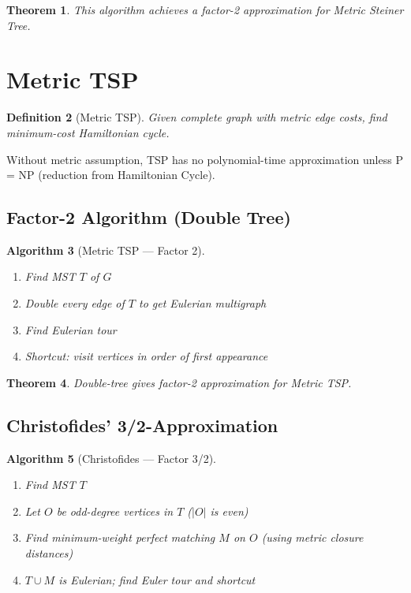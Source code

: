 \documentclass[11pt,oneside]{book}
\newtheorem{theorem}{Theorem}[chapter]
\newtheorem{definition}[theorem]{Definition}
\newtheorem{algorithmdef}[theorem]{Algorithm}
\begin{document}
\begin{theorem}
This algorithm achieves a factor-2 approximation for Metric Steiner Tree.
\end{theorem}

\section{Metric TSP}

\begin{definition}[Metric TSP]
Given complete graph with metric edge costs, find minimum-cost Hamiltonian cycle.
\end{definition}

Without metric assumption, TSP has no polynomial-time approximation unless P = NP (reduction from Hamiltonian Cycle).

\subsection{Factor-2 Algorithm (Double Tree)}

\begin{algorithmdef}[Metric TSP — Factor 2]
\begin{enumerate}
    \item Find MST $T$ of $G$
    \item Double every edge of $T$ to get Eulerian multigraph
    \item Find Eulerian tour
    \item Shortcut: visit vertices in order of first appearance
\end{enumerate}
\end{algorithmdef}

\begin{theorem}
Double-tree gives factor-2 approximation for Metric TSP.
\end{theorem}

\subsection{Christofides' 3/2-Approximation}

\begin{algorithmdef}[Christofides — Factor 3/2]
\begin{enumerate}
    \item Find MST $T$
    \item Let $O$ be odd-degree vertices in $T$ ($|O|$ is even)
    \item Find minimum-weight perfect matching $M$ on $O$ (using metric closure distances)
    \item $T \cup M$ is Eulerian; find Euler tour and shortcut
\end{enumerate}
\end{algorithmdef}
\end{document}
